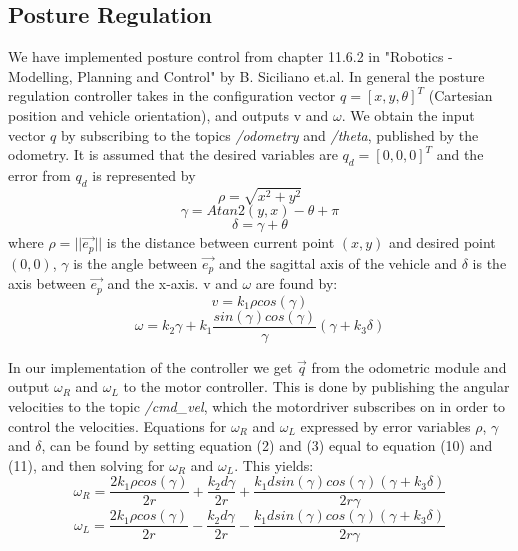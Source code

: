 \documentclass[a4paper,10pt]{article}
\begin{document}
		
\subsection{Posture Regulation}

	
		We have implemented posture control from chapter 11.6.2 in  "Robotics - Modelling, Planning and Control" by B. Siciliano et.al. 
		In general the posture regulation controller takes in the configuration vector $q = [x, y, \theta]^{T}$ (Cartesian position and vehicle orientation), 
		and outputs v and $\omega$. We obtain the input vector $q$ by subscribing to the topics \textit{/odometry} and \textit{/theta}, published by the odometry.
		It is assumed that the desired variables are $q_{d} = [0, 0, 0]^{T}$ and the error from $q_{d}$ is represented by
		\begin{equation}
			\rho = \sqrt{x^{2} + y^{2}} 
		\end{equation}
		\begin{equation}
			\gamma = Atan2(y, x) - \theta + \pi
		\end{equation}
		\begin{equation}
			\delta = \gamma + \theta
		\end{equation}
		where $\rho = ||\vec{e_{p}}||$ is the distance between current point $(x, y)$ and desired point $(0, 0)$, 
		$\gamma$ is the angle between $\vec{e_{p}}$	and the sagittal axis of the vehicle and $\delta$ is the axis between $\vec{e_{p}}$ and the x-axis.	
		v and $\omega$ are found by:
		\begin{equation}
			v = k_{1}\rho cos(\gamma)
		\end{equation}		
		\begin{equation}
			\omega = k_{2}\gamma + k_{1}\frac{sin(\gamma)cos(\gamma)}{\gamma}(\gamma + k_{3}\delta)
		\end{equation}
		
		In our implementation of the controller we get $\vec{q}$ from the odometric module and output $\omega_{R}$ and $\omega_{L}$ to the motor controller. 
		This is done by publishing the angular velocities to the topic \textit{/cmd\_vel}, which the motordriver subscribes on in order to control the velocities.
		Equations for $\omega_{R}$ and $\omega_{L}$ expressed by error variables $\rho$, $\gamma$ and $\delta$, can be found
		by setting equation (2) and (3) equal to equation (10) and (11), and then solving for $\omega_{R}$ and $\omega_{L}$. This yields:		
		\begin{equation}
			\omega_{R} = \frac{2k_{1}\rho cos(\gamma)}{2r} + \frac{k_{2}d\gamma}{2r} + \frac{k_{1}dsin(\gamma)cos(\gamma)(\gamma + k_{3}\delta)}{2r\gamma}
		\end{equation}
		\begin{equation}
			\omega_{L} = \frac{2k_{1}\rho cos(\gamma)}{2r} - \frac{k_{2}d\gamma}{2r} - \frac{k_{1}dsin(\gamma)cos(\gamma)(\gamma + k_{3}\delta)}{2r\gamma}
		\end{equation}
\end{document}
